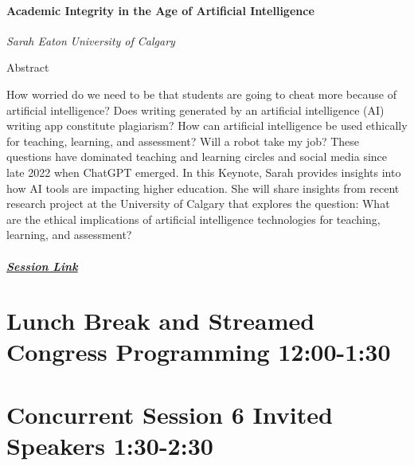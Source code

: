 \documentclass[
]{book}
\begin{document}
\begin{keynote}
 \hypertarget{academic-integrity-in-the-age-of-artificial-intelligence}{%
 \paragraph*{Academic Integrity in the Age of Artificial
 Intelligence}\label{academic-integrity-in-the-age-of-artificial-intelligence}}
 
 \emph{Sarah Eaton} \emph{University of Calgary}
 
 Abstract
 
 How worried do we need to be that students are going to cheat more
 because of artificial intelligence? Does writing generated by an
 artificial intelligence (AI) writing app constitute plagiarism? How can
 artificial intelligence be used ethically for teaching, learning, and
 assessment? Will a robot take my job? These questions have dominated
 teaching and learning circles and social media since late 2022 when
 ChatGPT emerged. In this Keynote, Sarah provides insights into how AI
 tools are impacting higher education. She will share insights from
 recent research project at the University of Calgary that explores the
 question: What are the ethical implications of artificial intelligence
 technologies for teaching, learning, and assessment?
 
 \hypertarget{session-link}{%
 \subparagraph*{\texorpdfstring{\href{}{Session
 Link}}{Session Link}}\label{session-link}}
 \end{keynote}

\hypertarget{lunch-break-and-streamed-congress-programming-1200-130}{%
\section*{Lunch Break and Streamed Congress Programming \textbar{} 12:00-1:30}\label{lunch-break-and-streamed-congress-programming-1200-130}}

\hypertarget{concurrent-session-6-invited-speakers-130-230}{%
\section*{Concurrent Session 6 \textbar{} Invited Speakers \textbar{} 1:30-2:30}\label{concurrent-session-6-invited-speakers-130-230}}
\end{document}
